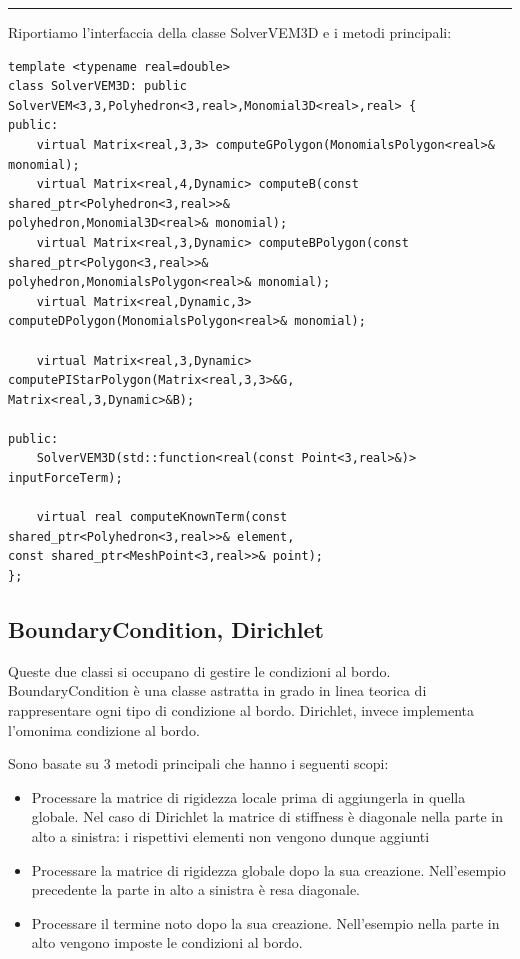 \documentclass[oneside,12pt]{book}  %
\theoremstyle{plain}
\theoremstyle{definition}
\theoremstyle{remark}
\numberwithin{equation}{chapter} %
\begin{document}
\noindent\rule{14cm}{1pt}

Riportiamo l'interfaccia della classe SolverVEM3D e i metodi principali:

\begin{verbatim}
template <typename real=double>
class SolverVEM3D: public SolverVEM<3,3,Polyhedron<3,real>,Monomial3D<real>,real> {
public:
    virtual Matrix<real,3,3> computeGPolygon(MonomialsPolygon<real>& monomial);
    virtual Matrix<real,4,Dynamic> computeB(const shared_ptr<Polyhedron<3,real>>& 
polyhedron,Monomial3D<real>& monomial);
    virtual Matrix<real,3,Dynamic> computeBPolygon(const shared_ptr<Polygon<3,real>>& 
polyhedron,MonomialsPolygon<real>& monomial);
    virtual Matrix<real,Dynamic,3> computeDPolygon(MonomialsPolygon<real>& monomial);
		
    virtual Matrix<real,3,Dynamic> computePIStarPolygon(Matrix<real,3,3>&G,
Matrix<real,3,Dynamic>&B);
	
public:
    SolverVEM3D(std::function<real(const Point<3,real>&)> inputForceTerm);
 
    virtual real computeKnownTerm(const shared_ptr<Polyhedron<3,real>>& element,
const shared_ptr<MeshPoint<3,real>>& point);	
};

\end{verbatim}

\subsection{BoundaryCondition, Dirichlet}
Queste due classi si occupano di gestire le condizioni al bordo.
BoundaryCondition \`e una classe astratta in grado in linea teorica di
rappresentare ogni tipo di condizione al bordo. Dirichlet, invece
implementa l'omonima condizione al bordo.

Sono basate su 3 metodi principali che hanno i seguenti scopi:
\begin{itemize}
\item
Processare la matrice di rigidezza locale prima di aggiungerla in
quella globale. Nel caso di Dirichlet la matrice di stiffness \`e
diagonale nella parte in alto a sinistra: i rispettivi elementi non vengono
dunque aggiunti

\item 
Processare la matrice di rigidezza globale dopo la sua
creazione. Nell'esempio precedente la parte in alto a sinistra \`e
resa diagonale.

\item
Processare il termine noto dopo la sua creazione. Nell'esempio nella
parte in alto vengono imposte le condizioni al bordo.

\end{itemize}
\end{document}
